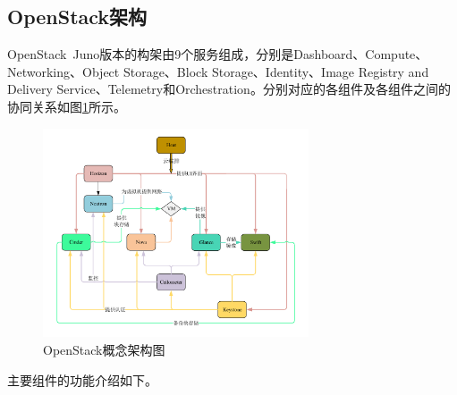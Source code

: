\subsection{OpenStack架构}
OpenStack\ Juno版本的构架由9个服务组成，分别是Dashboard、Compute、Networking、Object Storage、Block Storage、Identity、Image Registry and Delivery Service、Telemetry和Orchestration\cite{OpenStack-4}。分别对应的各组件及各组件之间的协同关系如图\ref{fig:openstack}所示。

\begin{figure}[!htb]
  \centering
  \includegraphics[width=0.7\textwidth]{logo/openstack}
  \caption{OpenStack概念架构图}
  \label{fig:openstack}
\end{figure}

主要组件的功能介绍如下\cite{OpenStack-3}。


